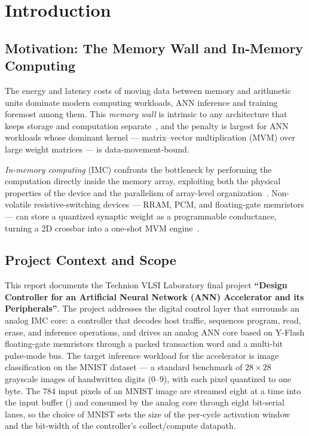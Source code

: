 
\chapter{Introduction}
\label{ch:introduction}

\section{Motivation: The Memory Wall and In-Memory Computing}
\label{sec:intro-motivation}

The energy and latency costs of moving data between memory and arithmetic
units dominate modern computing workloads, ANN inference and training
foremost among them. This \emph{memory wall} is intrinsic to any
architecture that keeps storage and computation
separate~\cite{Ielmini2018RRAM, Verma2019IMC, Sebastian2020IMC}, and the
penalty is largest for ANN workloads whose dominant kernel ---
matrix--vector multiplication (MVM) over large weight matrices --- is
data-movement-bound.

\emph{In-memory computing} (IMC) confronts the bottleneck by performing
the computation directly inside the memory array, exploiting both the
physical properties of the device and the parallelism of array-level
organization~\cite{Sebastian2020IMC, Verma2019IMC}. Non-volatile
resistive-switching devices --- RRAM, PCM, and floating-gate memristors
--- can store a quantized synaptic weight as a programmable conductance,
turning a 2D crossbar into a one-shot MVM
engine~\cite{Ielmini2018RRAM, Wang2022YFlash}.

\section{Project Context and Scope}
\label{sec:intro-context}

This report documents the Technion VLSI Laboratory final project
\textbf{``Design Controller for an Artificial Neural Network (ANN)
Accelerator and its Peripherals''}. The project addresses the digital
control layer that surrounds an analog IMC core: a controller that
decodes host traffic, sequences program, read, erase, and inference
operations, and drives an analog ANN core based on Y-Flash floating-gate
memristors through a packed transaction word and a multi-bit pulse-mode
bus. The target inference workload for the accelerator is image
classification on the MNIST dataset --- a standard benchmark of
$28\times28$ grayscale images of handwritten digits ($0$--$9$), with
each pixel quantized to one byte. The $784$ input pixels of an MNIST
image are streamed eight at a time into the input buffer
() and consumed by the analog core through eight
bit-serial lanes, so the choice of MNIST sets the size of the
per-cycle activation window and the bit-width of the controller's
collect/compute datapath.

